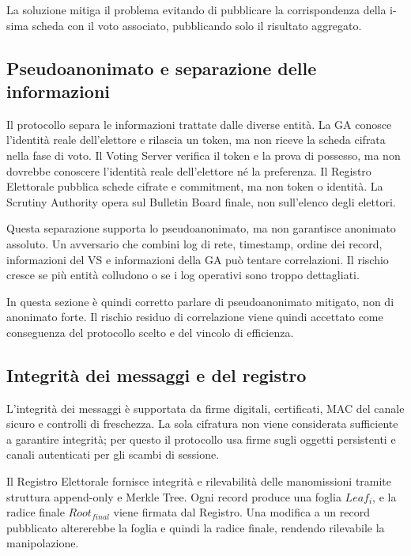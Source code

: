 \documentclass[a4paper,12pt]{article}
\begin{document}
La soluzione mitiga il problema evitando di pubblicare la corrispondenza della i-sima scheda con il voto associato, pubblicando solo il risultato aggregato.


\subsection{Pseudoanonimato e separazione delle informazioni}

Il protocollo separa le informazioni trattate dalle diverse entità.
La GA conosce l'identità reale dell'elettore e rilascia un token, ma non riceve la scheda cifrata nella fase di voto.
Il Voting Server verifica il token e la prova di possesso, ma non dovrebbe conoscere l'identità reale dell'elettore né la preferenza.
Il Registro Elettorale pubblica schede cifrate e commitment, ma non token o identità.
La Scrutiny Authority opera sul Bulletin Board finale, non sull'elenco degli elettori.

Questa separazione supporta lo pseudoanonimato, ma non garantisce anonimato assoluto.
Un avversario che combini log di rete, timestamp, ordine dei record, informazioni del VS e informazioni della GA può tentare correlazioni.
Il rischio cresce se più entità colludono o se i log operativi sono troppo dettagliati.

In questa sezione è quindi corretto parlare di pseudoanonimato mitigato, non di anonimato forte.
Il rischio residuo di correlazione viene quindi accettato come conseguenza del protocollo scelto e del vincolo di efficienza.

\subsection{Integrità dei messaggi e del registro}

L'integrità dei messaggi è supportata da firme digitali, certificati, MAC del canale sicuro e controlli di freschezza.
La sola cifratura non viene considerata sufficiente a garantire integrità; per questo il protocollo usa firme sugli oggetti persistenti e canali autenticati per gli scambi di sessione.

Il Registro Elettorale fornisce integrità e rilevabilità delle manomissioni tramite struttura append-only e Merkle Tree.
Ogni record produce una foglia \(Leaf_i\), e la radice finale \(Root_{final}\) viene firmata dal Registro.
Una modifica a un record pubblicato altererebbe la foglia e quindi la radice finale, rendendo rilevabile la manipolazione.
\end{document}
